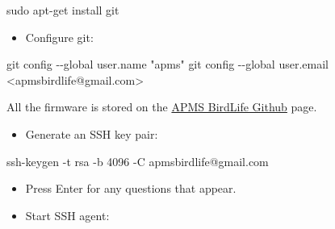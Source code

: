 \documentclass[
  letterpaper,
]{scrbook}
\newenvironment{Shaded}{\begin{snugshade}}{\end{snugshade}}
\newcommand{\AttributeTok}[1]{\textcolor[rgb]{0.40,0.45,0.13}{#1}}
\newcommand{\FunctionTok}[1]{\textcolor[rgb]{0.28,0.35,0.67}{#1}}
\newcommand{\NormalTok}[1]{\textcolor[rgb]{0.00,0.23,0.31}{#1}}
\newcommand{\OperatorTok}[1]{\textcolor[rgb]{0.37,0.37,0.37}{#1}}
\newcommand{\StringTok}[1]{\textcolor[rgb]{0.13,0.47,0.30}{#1}}
\providecommand{\tightlist}{%
  \setlength{\itemsep}{0pt}\setlength{\parskip}{0pt}}
\begin{document}
\begin{Shaded}
\begin{Highlighting}[]
\FunctionTok{sudo}\NormalTok{ apt{-}get install git}
\end{Highlighting}
\end{Shaded}

\begin{itemize}
\tightlist
\item
  Configure git:
\end{itemize}

\begin{Shaded}
\begin{Highlighting}[]
\FunctionTok{git}\NormalTok{ config }\AttributeTok{{-}{-}global}\NormalTok{ user.name }\StringTok{"apms"}
\FunctionTok{git}\NormalTok{ config }\AttributeTok{{-}{-}global}\NormalTok{ user.email }\OperatorTok{\textless{}}\NormalTok{apmsbirdlife@gmail.com}\OperatorTok{\textgreater{}}
\end{Highlighting}
\end{Shaded}

\begin{tcolorbox}[enhanced jigsaw, left=2mm, toptitle=1mm, breakable, opacitybacktitle=0.6, title=\textcolor{quarto-callout-tip-color}{\faLightbulb}\hspace{0.5em}{Tip}, colback=white, opacityback=0, rightrule=.15mm, leftrule=.75mm, colbacktitle=quarto-callout-tip-color!10!white, bottomtitle=1mm, titlerule=0mm, coltitle=black, colframe=quarto-callout-tip-color-frame, arc=.35mm, bottomrule=.15mm, toprule=.15mm]

All the firmware is stored on the
\href{https://www.github.com/apmsbirdlife/apms}{APMS BirdLife Github}
page.

\end{tcolorbox}

\begin{itemize}
\tightlist
\item
  Generate an SSH key pair:
\end{itemize}

\begin{Shaded}
\begin{Highlighting}[]
\FunctionTok{ssh{-}keygen} \AttributeTok{{-}t}\NormalTok{ rsa }\AttributeTok{{-}b}\NormalTok{ 4096 }\AttributeTok{{-}C}\NormalTok{ apmsbirdlife@gmail.com}
\end{Highlighting}
\end{Shaded}

\begin{itemize}
\item
  Press Enter for any questions that appear.
\item
  Start SSH agent:
\end{itemize}
\end{document}
